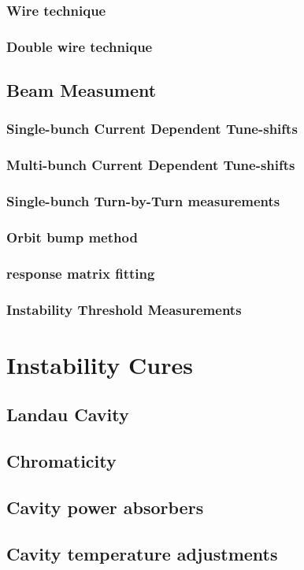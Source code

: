 \subsubsection{Wire technique}
\subsubsection{Double wire technique}
\subsection{Beam Measument}
\subsubsection{Single-bunch Current Dependent Tune-shifts}
\subsubsection{Multi-bunch Current Dependent Tune-shifts}
\subsubsection{Single-bunch Turn-by-Turn measurements}
\subsubsection{Orbit bump method}
\subsubsection{response matrix fitting}
\subsubsection{Instability Threshold Measurements}
\section{Instability Cures}
\subsection{Landau Cavity}
\subsection{Chromaticity}
\subsection{Cavity power absorbers}
\subsection{Cavity temperature adjustments}
